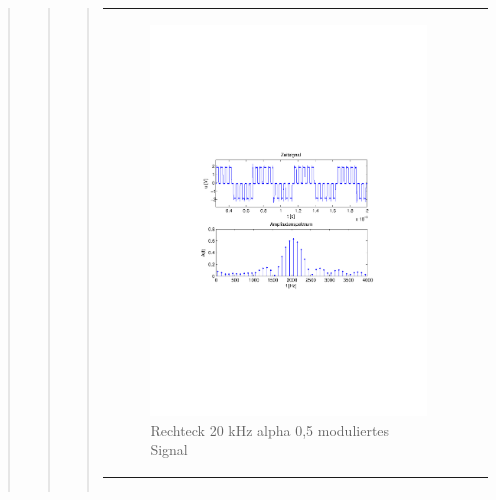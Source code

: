 \begin{quote}
\begin{quote}
\begin{quote}
\begin{center}
\begin{tabular}{ll}
                \begin{minipage}{0.6\textwidth}
                    \begin{figure}[H]
                        \includegraphics[scale=0.55, trim = 16mm 70mm 16mm 85mm, clip]{Bilder/shaperec20_05abget_zeit}
                       \caption{Rechteck 20 kHz alpha 0,5 moduliertes Signal}
		              \label{fig:shaperec20_05zeit}
                    \end{figure}
                \end{minipage}
            
            \end{tabular}
            \end{center}
            
            \begin{center}
            \begin{tabular}{ll}
            

\end{tabular}
\end{center}
\end{quote}
\end{quote}
\end{quote}
